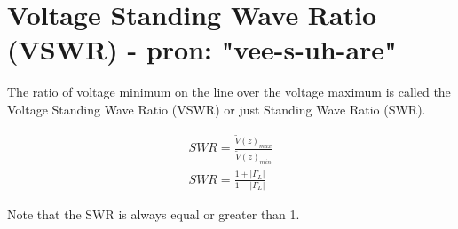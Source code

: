 \documentclass{ximera}
\begin{document}
\section{Voltage Standing Wave Ratio (VSWR) - pron: "vee-s-uh-are"}





The ratio of voltage minimum on the line over the voltage maximum is
called the Voltage Standing Wave Ratio (VSWR) or just Standing Wave
Ratio (SWR).

\begin{eqnarray}
SWR=\frac{\tilde{V}(z)_{max}}{ \tilde{V}(z)_{min}} \nonumber \\
SWR=\frac{1+|\Gamma_L|}{1-|\Gamma_L|}
\end{eqnarray}



Note that the SWR is always equal or greater than 1. 
\end{document}
